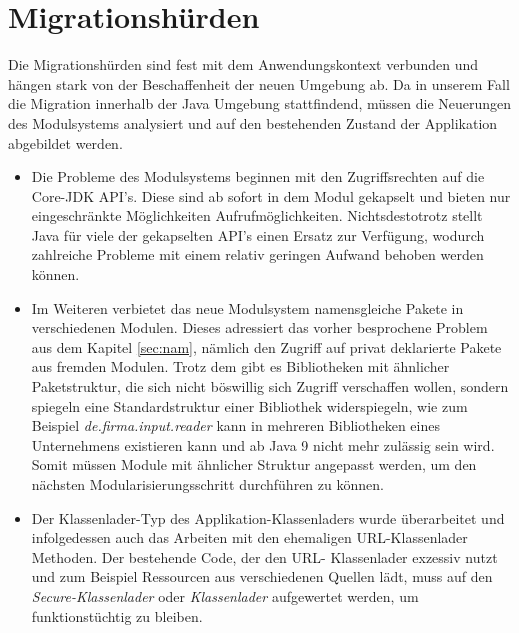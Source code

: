 \section{Migrationshürden} \label{MigH}

	Die Migrationshürden sind fest mit dem Anwendungskontext verbunden und hängen stark von der Beschaffenheit der neuen Umgebung ab. Da in unserem Fall die Migration innerhalb der Java Umgebung stattfindend, müssen die Neuerungen des Modulsystems analysiert und auf den bestehenden Zustand der Applikation abgebildet werden.\bigbreak

\begin{itemize}
	\item Die Probleme des Modulsystems beginnen mit den Zugriffsrechten auf die Core-JDK API's. Diese sind ab sofort in dem Modul gekapselt und bieten nur eingeschränkte Möglichkeiten Aufrufmöglichkeiten. Nichtsdestotrotz stellt Java für viele der gekapselten API's einen Ersatz zur Verfügung, wodurch zahlreiche Probleme mit einem relativ geringen Aufwand behoben werden können. \cite{masteringJava9,modulProgJava9,modulMitJava9,javaMod9} 


	\item Im Weiteren verbietet das neue Modulsystem namensgleiche Pakete in verschiedenen Modulen. Dieses adressiert das vorher besprochene Problem aus dem Kapitel \ref{sec:nam}, nämlich den Zugriff auf privat deklarierte Pakete aus fremden Modulen. Trotz dem gibt es Bibliotheken mit ähnlicher Paketstruktur, die sich nicht böswillig sich Zugriff verschaffen wollen, sondern spiegeln eine Standardstruktur einer Bibliothek widerspiegeln, wie zum Beispiel \textit{de.firma.input.reader} kann in mehreren Bibliotheken eines Unternehmens existieren kann und ab Java 9 nicht mehr zulässig sein wird. Somit müssen Module mit ähnlicher Struktur angepasst werden, um den nächsten Modularisierungsschritt durchführen zu können. \cite{masteringJava9,modulProgJava9,modulMitJava9,javaMod9} 


	\item Der Klassenlader-Typ des Applikation-Klassenladers wurde überarbeitet und infolgedessen auch das Arbeiten mit den ehemaligen URL-Klassenlader Methoden. Der bestehende Code, der den URL- Klassenlader exzessiv nutzt und zum Beispiel Ressourcen aus verschiedenen Quellen lädt, muss auf den \textit{Secure-Klassenlader} oder  \textit{Klassenlader} aufgewertet werden, um funktionstüchtig zu bleiben. \cite{oracModClassLoader,jecan2017java} 



\end{itemize}
